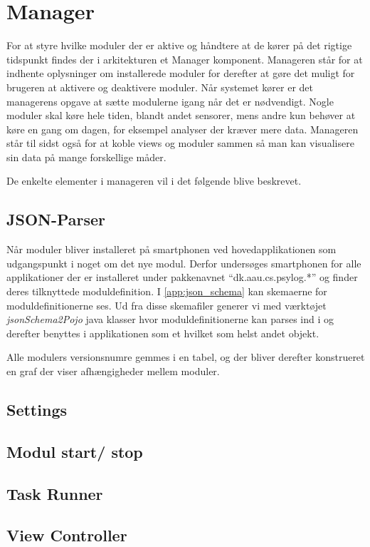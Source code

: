 \section{Manager}

For at styre hvilke moduler der er aktive og håndtere at de kører på det rigtige tidspunkt findes der i arkitekturen et Manager komponent.
Manageren står for at indhente oplysninger om installerede moduler for derefter at gøre det muligt for brugeren at aktivere og deaktivere moduler.
Når systemet kører er det managerens opgave at sætte modulerne igang når det er nødvendigt.
Nogle moduler skal køre hele tiden, blandt andet sensorer, mens andre kun behøver at køre en gang om dagen, for eksempel analyser der kræver mere data.
Manageren står til sidst også for at koble views og moduler sammen så man kan visualisere sin data på mange forskellige måder.

De enkelte elementer i manageren vil i det følgende blive beskrevet.

\subsection{JSON-Parser}

Når moduler bliver installeret på smartphonen ved hovedapplikationen som udgangspunkt i noget om det nye modul.
Derfor undersøges smartphonen for alle applikationer der er installeret under pakkenavnet ``dk.aau.cs.psylog.*'' og finder deres tilknyttede moduldefinition.
I \cref{app:json_schema} kan skemaerne for moduldefinitionerne ses.
Ud fra disse skemafiler generer vi med værktøjet \textit{jsonSchema2Pojo} \cite{jsonpojo} java klasser hvor moduldefinitionerne kan parses ind i og derefter benyttes i applikationen som et hvilket som helst andet objekt.


Alle modulers versionsnumre gemmes i en tabel, og der bliver derefter konstrueret en graf der viser afhængigheder mellem moduler.

\subsection{Settings}


\subsection{Modul start/ stop}

\subsection{Task Runner}

\subsection{View Controller}
